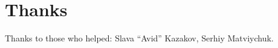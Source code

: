 ﻿\documentclass[11pt]{book}
\author{\AUTHOR}
\title{\TITLE}
\begin{document}


\newcommand{\myhrule}{\begin{center}\rule{0.5\textwidth}{.4pt}\end{center}}

\newcommand{\GitHubURL}{https://github.com/DennisYurichev/Math-for-programmers}
\newcommand{\GitHubBlobMasterURL}{\GitHubURL/blob/master}
\newcommand{\GitHubTreeMasterURL}{\GitHubURL/tree/master}

\newcommand{\SSBE}{``SAT/SMT by Example''\footnote{\url{https://yurichev.com/writings/SAT_SMT_by_example.pdf}}}

\maketitle

\tableofcontents

\section*{Thanks}

Thanks to those who helped: Slava ``Avid'' Kazakov, Serhiy Matviychuk.

\mainmatter

\newcommand{\CURPATH}{}











\end{document}

